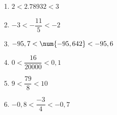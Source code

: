 %
%
  \begin{enumerate}[cols=2]
    \item $2<\num{2,78932}<3$
    \item $-3<- \dfrac{11}{5}<-2$
    \item $-95,7 < \num{- 95,642} < -95,6$
    \item $0<\dfrac{16}{\num{20000}}<0,1$
    \item $9<\dfrac{79}{8}<10$
    \item $-0,8<\dfrac{-3}{4}<-0,7$
  \end{enumerate}
